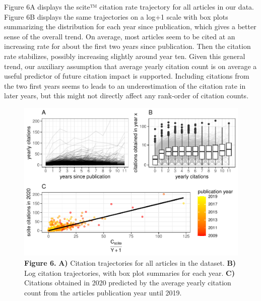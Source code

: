 \documentclass[
  man,floatsintext]{apa6}
\begin{document}
Figure 6A displays the scite™ citation rate trajectory for all articles in our data. Figure 6B displays the same trajectories on a log+1 scale with box plots summarizing the distribution for each year since publication, which gives a better sense of the overall trend. On average, most articles seem to be cited at an increasing rate for about the first two years since publication. Then the citation rate stabilizes, possibly increasing slightly around year ten. Given this general trend, our auxiliary assumption that average yearly citation count is on average a useful predictor of future citation impact is supported. Including citations from the two first years seems to leads to an underestimation of the citation rate in later years, but this might not directly affect any rank-order of citation counts.

\begin{figure}
\centering
\includegraphics{RVcn_feasibility_in_social_neuroscience_cortex_files/figure-latex/fig6-1.pdf}
\caption{\label{fig:fig6}\textbf{Figure 6.} \textbf{A)} Citation trajectories for all articles in the dataset. \textbf{B)} Log citation trajectories, with box plot summaries for each year. \textbf{C)} Citations obtained in 2020 predicted by the average yearly citation count from the articles publication year until 2019.}
\end{figure}
\end{document}

